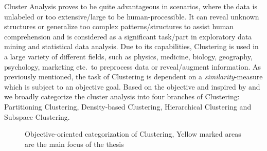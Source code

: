 Cluster Analysis proves to be quite advantageous in scenarios, where the data is unlabeled or too extensive/large to be human-processible. It can reveal unknown structures or generalize too complex patterns/structures to assist human comprehension and is considered as a significant task/part in exploratory data mining and statistical data analysis. Due to its capabilities, Clustering is used in a large variety of different fields, such as physics, medicine, biology, geography, psychology, marketing etc.\ to preprocess data or reveal/augment information\cite{kriegel2009clustering}.
As previously mentioned, the task of Clustering is dependent on a \textit{similarity}-measure which is subject to an objective goal. Based on the objective and inspired by \textcite{validationhalkidi2001clustering} and \textcite[Ch.10.1.3]{han2011data} we broadly categorize the cluster analysis into four branches of Clustering: Partitioning Clustering, Density-based Clustering, Hierarchical Clustering and Subspace Clustering. 

\begin{figure}
    \centering
    \caption{Objective-oriented categorization of Clustering, Yellow marked areas are the main focus of the thesis}
    \label{fig:clusteringtree}
\end{figure}


